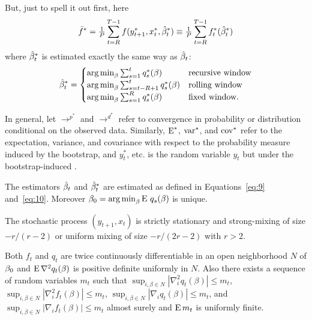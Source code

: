\documentclass[12pt,fleqn]{article}
\begin{document}
But, just to spell it out first, here
\begin{equation}
  \bar f^* = \tfrac{1}{P} \sum_{t=R}^{T-1} f(y_{t+1}^*, x_t^*, \hat \beta_t^*) \equiv \tfrac{1}{P} \sum_{t=R}^{T-1} f_t^*(\hat \beta_t^*)
\end{equation}
where $\hat \beta_t^*$ is estimated exactly the same way as $\hat \beta_t$:
\begin{equation}\label{eq:10}
  \hat\beta_t^* = \begin{cases}
    \operatorname*{arg\,min}_\beta \sum_{s=1}^t q_{s}^*(\beta) & \text{recursive window} \\
    \operatorname*{arg\,min}_\beta \sum_{s=t-R+1}^t q_{s}^*(\beta) & \text{rolling window} \\
    \operatorname*{arg\,min}_\beta \sum_{s=1}^R q_{s}^*(\beta) & \text{fixed window}.
  \end{cases}
\end{equation}

In general, let $\to^{p^{*}}$ and
$\to^{d^{*}}$ refer to convergence in probability or distribution
conditional on the observed data.  Similarly, $\operatorname{E}^{*}$, $\operatorname{var}^{*}$,
and $\operatorname{cov}^{*}$ refer to the expectation, variance, and covariance with
respect to the probability measure induced by the bootstrap, and
$y_t^{*}$, etc. is the random variable $y_t$ but under the
bootstrap-induced \cdf.

\begin{asmp}\label{a1}
  The estimators $\hat \beta_t$ and $\hat \beta_t^*$ are estimated as defined in
  Equations~\eqref{eq:9} and~\eqref{eq:10}. Moreover $\beta_0 =
  \operatorname*{arg\,min}_\beta \operatorname{E}\, q_s(\beta)$ is unique.
\end{asmp}

\begin{asmp}\label{a3}
  The stochastic process $(y_{t+1}, x_t)$ is strictly stationary and
  strong-mixing of size $-r/(r-2)$ or uniform mixing of size
  $-r/(2r-2)$ with $r>2$.
\end{asmp}

\begin{asmp}\label{a2}
  Both $f_t$ and $q_t$ are twice continuously differentiable in an
  open neighborhood $N$ of $\beta_0$ and $\operatorname{E} \nabla^2 q_t(\beta)$ is
  positive definite uniformly in $N$. Also there exists a sequence of
  random variables $m_t$ such that $\sup_{i,\beta \in N} |\nabla_i^2
  q_t(\beta)| \leq m_t$, $\sup_{i,\beta \in N} |\nabla_i^2
  f_t(\beta)| \leq m_t$, $\sup_{i,\beta \in N} |\nabla_i q_t(\beta)|
  \leq m_t$, and $\sup_{i,\beta \in N} |\nabla_i f_t(\beta)|
  \leq m_t$ almost surely and $\operatorname{E} m_t$ is uniformly finite.
\end{asmp}
\end{document}
